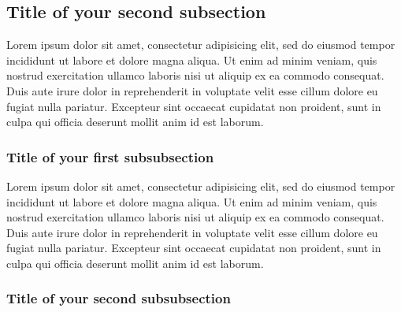 \subsection{Title of your second subsection}

Lorem ipsum dolor sit amet, consectetur adipisicing elit, sed do eiusmod tempor incididunt ut labore et dolore magna aliqua. Ut enim ad minim veniam,
quis nostrud exercitation ullamco laboris nisi ut aliquip ex ea commodo consequat. Duis aute irure dolor in reprehenderit in voluptate velit esse
cillum dolore eu fugiat nulla pariatur. Excepteur sint occaecat cupidatat non proident, sunt in culpa qui officia deserunt mollit anim id est laborum.

\subsubsection{Title of your first subsubsection}

Lorem ipsum dolor sit amet, consectetur adipisicing elit, sed do eiusmod tempor incididunt ut labore et dolore magna aliqua. Ut enim ad minim veniam,
quis nostrud exercitation ullamco laboris nisi ut aliquip ex ea commodo consequat. Duis aute irure dolor in reprehenderit in voluptate velit esse
cillum dolore eu fugiat nulla pariatur. Excepteur sint occaecat cupidatat non proident, sunt in culpa qui officia deserunt mollit anim id est laborum.

\subsubsection{Title of your second subsubsection}


